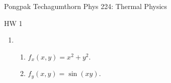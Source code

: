 \documentclass{article}
\begin{document}
\large %
{\Large Pongpak Techagumthorn
\hfill Phys 224: Thermal Physics}
\begin{center}
{\Large
HW 1
}
\end{center}
\vspace{0.1in}
\begin{enumerate}
    \item [1.8]
    \begin{enumerate}
        \item $f_x(x,y) = x^2+y^2$.
        \item $f_y(x,y) = \sin(xy)$.
    \end{enumerate}
    \vspace{0.1in}

\end{enumerate}
\end{document}
